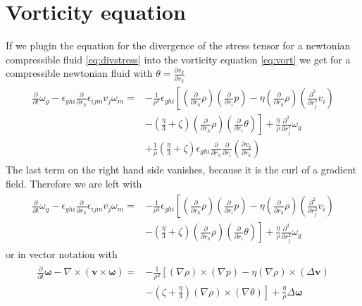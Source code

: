 \documentclass[a4paper,
					fontsize=12pt,
					twoside,
					pagesize,
					cleardoublepage=plain,
					headsepline,
					bibliography=totoc
					]{scrbook}
\renewcommand{\vec}[1]{\boldsymbol{#1}}
\newcommand{\lra}[1]{{ \left( #1 \right) }}
\newcommand{\pd}[1]{\frac{\partial}{\partial #1}}
\newcommand{\ppd}[2]{\frac{\partial #2}{\partial #1}}
\newcommand{\pdd}[1]{\frac{\partial^2}{\partial #1^2}}
\begin{document}
\section{Vorticity equation}
If we plugin the equation for the divergence of the
stress tensor for a newtonian compressible fluid \eqref{eq:divstress} into
the vorticity equation \eqref{eq:vort} we get for a compressible newtonian
fluid with $\theta=\ppd{r_k}{v_k}$
\begin{align}
\begin{split}
\pd{t}\omega_g
-\epsilon_{ghi}\pd{r_h} \epsilon_{ijm} v_j \omega_m =
&-\frac{1}{\rho^2}\epsilon_{ghi}\left[
\lra{\pd{r_h}\rho} \lra{\pd{r_i}p}
-\eta \lra{\pd{r_h}\rho} \lra{\pdd{r_j}v_i}\right.\\
&\left.-\lra{\frac{\eta}{3}+\zeta} \lra{\pd{r_h}\rho} 
\lra{\pd{r_i}\theta} \right]
+\frac{\eta}{\rho}\pdd{r_j}\omega_g \\
&+\frac{1}{\rho}\lra{\frac{\eta}{3}
+\zeta}\epsilon_{ghi}\pd{r_h}\pd{r_i}\lra{\ppd{r_k}{v_k}}
\end{split}
\end{align}
The last term on the right hand side vanishes, because it is the curl
of a gradient field. Therefore we are left with
\begin{align}
\begin{split}
\pd{t}\omega_g
-\epsilon_{ghi}\pd{r_h} \epsilon_{ijm} v_j \omega_m =
&-\frac{1}{\rho^2}\epsilon_{ghi}\left[
\lra{\pd{r_h}\rho} \lra{\pd{r_i}p}
-\eta \lra{\pd{r_h}\rho} \lra{\pdd{r_j}v_i}\right.\\
&\left.-\lra{\frac{\eta}{3}+\zeta} \lra{\pd{r_h}\rho} 
\lra{\pd{r_i}\theta} \right]
+\frac{\eta}{\rho}\pdd{r_j}\omega_g
\end{split}
\end{align}
or in vector notation with 
\begin{align}
\begin{split}
\pd{t} \vec{\omega}-\nabla \times (\vec{v} \times \vec{\omega}) = 
&-\frac{1}{\rho^2}\left[
(\nabla \rho) \times(\nabla p)
- \eta (\nabla \rho) \times (\Delta \vec{v})\right.\\
&\left.- \lra{\zeta +\frac{\eta}{3}} (\nabla \rho) \times (\nabla
\theta)\right]
+\frac{\eta}{\rho} \Delta \vec{\omega}
\end{split}
\end{align}
\end{document}
